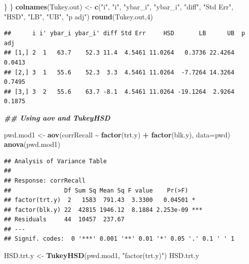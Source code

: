 \documentclass[
]{book}
\newenvironment{Shaded}{\begin{snugshade}}{\end{snugshade}}
\newcommand{\AttributeTok}[1]{\textcolor[rgb]{0.13,0.29,0.53}{#1}}
\newcommand{\DecValTok}[1]{\textcolor[rgb]{0.00,0.00,0.81}{#1}}
\newcommand{\DocumentationTok}[1]{\textcolor[rgb]{0.56,0.35,0.01}{\textbf{\textit{#1}}}}
\newcommand{\FunctionTok}[1]{\textcolor[rgb]{0.13,0.29,0.53}{\textbf{#1}}}
\newcommand{\NormalTok}[1]{#1}
\newcommand{\OtherTok}[1]{\textcolor[rgb]{0.56,0.35,0.01}{#1}}
\newcommand{\SpecialCharTok}[1]{\textcolor[rgb]{0.81,0.36,0.00}{\textbf{#1}}}
\newcommand{\StringTok}[1]{\textcolor[rgb]{0.31,0.60,0.02}{#1}}
\begin{document}
\begin{Shaded}
\begin{Highlighting}[]
\NormalTok{  \}}
\NormalTok{\}}
\FunctionTok{colnames}\NormalTok{(Tukey.out) }\OtherTok{\textless{}{-}} \FunctionTok{c}\NormalTok{(}\StringTok{"i"}\NormalTok{, }\StringTok{"i\textquotesingle{}"}\NormalTok{, }\StringTok{"ybar\_i"}\NormalTok{, }\StringTok{"ybar\_i\textquotesingle{}"}\NormalTok{, }\StringTok{"diff"}\NormalTok{, }\StringTok{"Std Err"}\NormalTok{, }\StringTok{"HSD"}\NormalTok{,}
                         \StringTok{"LB"}\NormalTok{, }\StringTok{"UB"}\NormalTok{, }\StringTok{"p adj"}\NormalTok{)}
\FunctionTok{round}\NormalTok{(Tukey.out,}\DecValTok{4}\NormalTok{)}
\end{Highlighting}
\end{Shaded}

\begin{verbatim}
##      i i' ybar_i ybar_i' diff Std Err     HSD       LB      UB  p adj
## [1,] 2  1   63.7    52.3 11.4  4.5461 11.0264   0.3736 22.4264 0.0413
## [2,] 3  1   55.6    52.3  3.3  4.5461 11.0264  -7.7264 14.3264 0.7495
## [3,] 3  2   55.6    63.7 -8.1  4.5461 11.0264 -19.1264  2.9264 0.1875
\end{verbatim}

\begin{Shaded}
\begin{Highlighting}[]
\DocumentationTok{\#\# Using aov and TukeyHSD}

\NormalTok{pwd.mod1 }\OtherTok{\textless{}{-}} \FunctionTok{aov}\NormalTok{(corrRecall }\SpecialCharTok{\textasciitilde{}} \FunctionTok{factor}\NormalTok{(trt.y) }\SpecialCharTok{+} \FunctionTok{factor}\NormalTok{(blk.y), }\AttributeTok{data=}\NormalTok{pwd)}
\FunctionTok{anova}\NormalTok{(pwd.mod1)}
\end{Highlighting}
\end{Shaded}

\begin{verbatim}
## Analysis of Variance Table
## 
## Response: corrRecall
##               Df Sum Sq Mean Sq F value    Pr(>F)    
## factor(trt.y)  2   1583  791.43  3.3300   0.04501 *  
## factor(blk.y) 22  42815 1946.12  8.1884 2.253e-09 ***
## Residuals     44  10457  237.67                      
## ---
## Signif. codes:  0 '***' 0.001 '**' 0.01 '*' 0.05 '.' 0.1 ' ' 1
\end{verbatim}

\begin{Shaded}
\begin{Highlighting}[]
\NormalTok{HSD.trt.y }\OtherTok{\textless{}{-}} \FunctionTok{TukeyHSD}\NormalTok{(pwd.mod1, }\StringTok{"factor(trt.y)"}\NormalTok{)}
\NormalTok{HSD.trt.y}
\end{Highlighting}
\end{Shaded}
\end{document}

